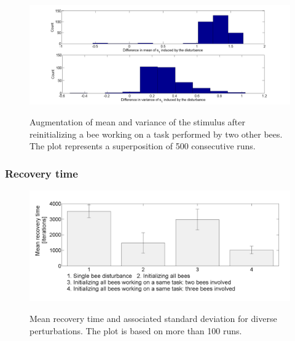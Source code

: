 \begin{figure}[ht!]
\begin{centering}
\includegraphics[scale=0.35]{figures/Augmentation2_2}
\label{fig:figure4}
\par\end{centering}

\begin{centering}
\caption{Augmentation of mean and variance of the stimulus after reinitializing a bee working on a task performed by two other bees. The plot represents a superposition of 500 consecutive runs.}

\par\end{centering}

\end{figure}

\subsubsection{Recovery time}

\begin{center}
\begin{figure}[ht!]
\includegraphics[scale=0.35]{figures/Figure3.png}
\label{fig:figure5}
\caption{Mean recovery time and associated standard deviation for diverse perturbations. The plot is based on more than 100 runs.}
\end{figure}
\par\end{center}

